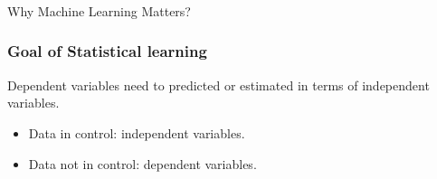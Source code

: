 


\begin{frame}[fragile]\frametitle{}
\begin{center}
{\Large Why Machine Learning Matters?}
\end{center}
\end{frame}


\begin{frame}[fragile]\frametitle{Goal of Statistical learning}
Dependent variables need to predicted or estimated in terms of independent variables.

	\begin{itemize}
	\item Data in control: independent variables.
	\item Data not in control: dependent variables.
	\end{itemize}
\end{frame}

